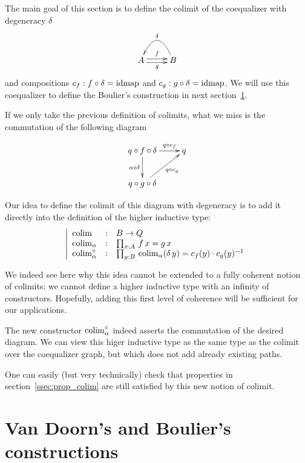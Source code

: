 The main goal of this section is to define the colimit of the
coequalizer with degeneracy $\delta$
\[
  \xymatrix{
    A \ar@<-.5ex>[r]_g \ar@<.5ex>[r]^f & B \ar@/_2pc/[l]_\delta
  }
\] 
and compositions $c_f:f \circ \delta = \operatorname{\mathrm{idmap}}$ and $c_g:g \circ \delta =
\operatorname{\mathrm{idmap}}$. We will use this coequalizer to define the Boulier's
construction in next section~\ref{sec:floris}.

If we only take the previous definition of colimits, what we miss is
the commutation of the following diagram

\[
  \xymatrix{
    q \circ f \circ \delta \ar[r]^-{q \circ c_f} \ar[d]_-{\alpha \circ \delta} & q \\
    q\circ g \circ \delta \ar[ru]_-{q\circ c_g}
  }
\]

Our idea to define the colimit of this diagram with degeneracy is to
add it directly into the definition of the higher inductive type:
\[
  \left|
    \begin{array}{lll}
      \mathrm{colim}&:& B \to Q \\
      \mathrm{colim}_\alpha&:& \prod_{x:A}\, f\, x = g\, x\\
      \mathrm{colim}_\alpha^\circ &:& \prod_{y:B}\, \mathrm{colim}_\alpha(\delta\, y) =
                              c_f(y)\cdot c_g(y)^{-1}
    \end{array}
  \right.
\]

\begin{rmq}
  We indeed see here why this idea cannot be extended to a fully
  coherent notion of colimits: we cannot define a higher inductive
  type with an infinity of constructors. Hopefully, adding this first
  level of coherence will be sufficient for our applications.
\end{rmq}

The new constructor $\mathrm{colim}_\alpha^\circ$ indeed asserts the
commutation of the desired diagram. We can view this higer inductive
type as the same type as the colimit over the coequalizer graph, but
which does not add already existing paths.

One can easily (but very technically) check that properties in
section~\ref{ssec:prop_colim} are still satisfied by this new notion
of colimit.


\section{Van Doorn's and Boulier's constructions}
\label{sec:floris}


